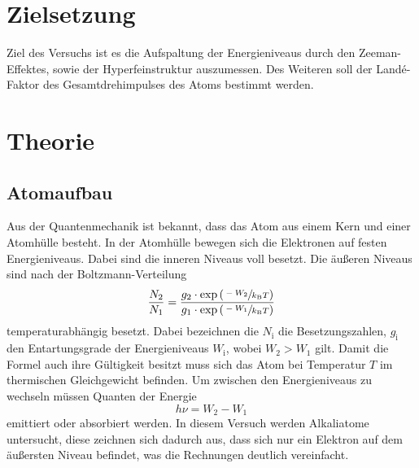 \section{Zielsetzung}
\label{sec:Zielsetzung}
Ziel des Versuchs ist es die Aufspaltung der Energieniveaus durch den Zeeman-Effektes,
sowie der Hyperfeinstruktur auszumessen. Des Weiteren soll der Landé-Faktor des Gesamtdrehimpulses
des Atoms bestimmt werden.

\section{Theorie}
\label{sec:Theorie}
\subsection{Atomaufbau}
\label{sec:atomaufbau}
Aus der Quantenmechanik ist bekannt, dass das Atom aus einem Kern und einer Atomhülle besteht.
In der Atomhülle bewegen sich die Elektronen auf festen Energieniveaus. Dabei sind die inneren
Niveaus voll besetzt. Die äußeren Niveaus sind nach der Boltzmann-Verteilung
\begin{equation}
  \label{eqn:boltz}
  \frac{N_2}{N_1} = \frac{g_2 \cdot \exp{\left(\sfrac{-W_2}{k_\text{B}T}\right)}}{g_1 \cdot \exp{\left(\sfrac{-W_1}{k_\text{B}T}\right)}}
\end{equation}
temperaturabhängig besetzt. Dabei bezeichnen die $N_\text{i}$ die Besetzungszahlen, $g_\text{i}$ den Entartungsgrade
der Energieniveaus $W_\text{i}$, wobei $W_2 > W_1$ gilt. Damit die Formel auch ihre Gültigkeit besitzt
muss sich das Atom bei Temperatur $T$ im thermischen Gleichgewicht befinden.
Um zwischen den Energieniveaus zu wechseln müssen Quanten der Energie
\begin{equation}
  \label{eqn:energiedifferenz}
  h \nu = W_2 - W_1
\end{equation}
emittiert oder absorbiert werden. 
In diesem Versuch werden Alkaliatome untersucht, diese zeichnen sich dadurch aus, dass sich nur ein 
Elektron auf dem äußersten Niveau befindet, was die Rechnungen deutlich vereinfacht.

